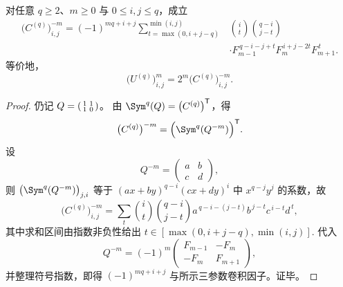 \begin{theorem}[逆二项矩阵负幂的逐项卷积闭式]\label{thm:xi-replica-softcore-binomial-inverse-negative-power-entrywise}
对任意 \(q\ge2\)、\(m\ge0\) 与 \(0\le i,j\le q\)，成立
\[
\boxed{
\begin{aligned}
\bigl(C^{(q)}\bigr)^{-m}_{i,j}
=(-1)^{mq+i+j}
\sum_{t=\max(0,i+j-q)}^{\min(i,j)}
&\binom{i}{t}\binom{q-i}{j-t}\\
&\cdot F_{m-1}^{\,q-i-j+t}
F_m^{\,i+j-2t}
F_{m+1}^{\,t}.
\end{aligned}
}
\]
等价地，
\[
\bigl(U^{(q)}\bigr)^m_{i,j}=2^m\bigl(C^{(q)}\bigr)^{-m}_{i,j}.
\]
\end{theorem}
\begin{proof}
仍记
\(
Q=\begin{psmallmatrix}1&1\\1&0\end{psmallmatrix}
\)。
由 \(\Sym^q(Q)=\bigl(C^{(q)}\bigr)^{\mathsf T}\)，得
\[
\bigl(C^{(q)}\bigr)^{-m}
=\Bigl(\Sym^q(Q^{-m})\Bigr)^{\mathsf T}.
\]
设
\[
Q^{-m}=
\begin{pmatrix}
a&b\\ c&d
\end{pmatrix},
\]
则 \(\bigl(\Sym^q(Q^{-m})\bigr)_{j,i}\) 等于
\(
(ax+by)^{q-i}(cx+dy)^i
\)
中 \(x^{q-j}y^j\) 的系数，故
\[
\bigl(C^{(q)}\bigr)^{-m}_{i,j}
=\sum_{t}
\binom{i}{t}\binom{q-i}{j-t}
a^{\,q-i-(j-t)}b^{\,j-t}c^{\,i-t}d^{\,t},
\]
其中求和区间由指数非负性给出
\(
t\in[\max(0,i+j-q),\min(i,j)].
\)
代入
\[
Q^{-m}=(-1)^m
\begin{pmatrix}
F_{m-1}&-F_m\\ -F_m&F_{m+1}
\end{pmatrix},
\]
并整理符号指数，即得
\(
(-1)^{mq+i+j}
\)
与所示三参数卷积因子。证毕。
\end{proof}

\endinput

